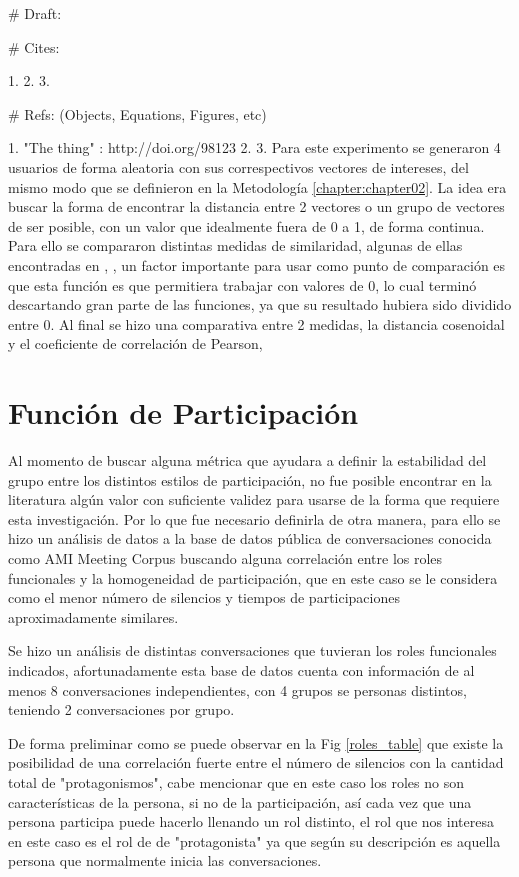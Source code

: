 # Draft:



# Cites:

1.
2.
3.

# Refs: (Objects, Equations, Figures, etc)

1. "The thing" : http://doi.org/98123
2.
3.
Para este experimento se generaron 4 usuarios de forma aleatoria con sus correspectivos vectores de intereses, del mismo modo que se definieron en la Metodología \ref{chapter:chapter02}. La idea era buscar la forma de encontrar la distancia entre 2 vectores o un grupo de vectores de ser posible, con un valor que idealmente fuera de 0 a 1, de forma continua. Para ello se compararon distintas medidas de similaridad, algunas de ellas encontradas en \cite{SeyedShirkhorshidi2015AData}, \cite{Sung-HyukChaComprehensiveFunctions}, un factor importante para usar como punto de comparación es que esta función es que permitiera trabajar con valores de 0, lo cual terminó descartando gran parte de las funciones, ya que su resultado hubiera sido dividido entre 0. Al final se hizo una comparativa entre 2 medidas, la distancia cosenoidal y el coeficiente de correlación de Pearson, 


\section{Función de Participación}

Al momento de buscar alguna métrica que ayudara a definir la estabilidad del grupo entre los distintos estilos de participación, no fue posible encontrar en la literatura algún valor con suficiente validez para usarse de la forma que requiere esta investigación. Por lo que fue necesario definirla de otra manera, para ello se hizo un análisis de datos a la base de datos pública de conversaciones conocida como AMI Meeting Corpus buscando alguna correlación entre los roles funcionales y la homogeneidad de participación, que en este caso se le considera como el menor número de silencios y tiempos de participaciones aproximadamente similares.

Se hizo un análisis de distintas conversaciones que tuvieran los roles funcionales indicados, afortunadamente esta base de datos cuenta con información de al menos 8 conversaciones independientes, con 4 grupos se personas distintos, teniendo 2 conversaciones por grupo. 

De forma preliminar como se puede observar en la Fig \ref{roles_table} que existe la posibilidad de una correlación fuerte entre el número de silencios con la cantidad total de "protagonismos", cabe mencionar que en este caso los roles no son características de la persona, si no de la participación, así cada vez que una persona participa puede hacerlo llenando un rol distinto, el rol que nos interesa en este caso es el rol de de "protagonista" ya que según su descripción es aquella persona que normalmente inicia las conversaciones. 

